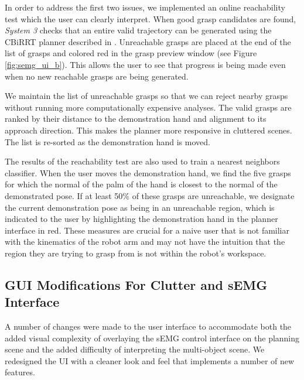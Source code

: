 In order to address the first two issues, we implemented an online reachability test which the user can clearly interpret. When good grasp candidates are found, \emph{System 3} checks that an entire valid trajectory can be generated using the CBiRRT planner described in \cite{berenson-09}. Unreachable grasps are placed at the end of the list of grasps and colored red in the grasp preview window (see Figure \ref{fig:semg_ui_b}). This allows the user to see that progress is being made even when no new reachable grasps are being generated.

We maintain the list of unreachable grasps so that we can reject nearby grasps without running more computationally expensive analyses. The valid grasps are ranked by their distance to the demonstration hand and alignment to its approach direction. This makes the planner more responsive in cluttered scenes. The list is re-sorted as the demonstration hand is moved.

The results of the reachability test are also used to train a nearest neighbors classifier. When the user moves the demonstration hand, we find the five grasps for which the normal of the palm of the hand is closest to the normal of the demonstrated pose. If at least 50\% of these grasps are unreachable, we designate the current demonstration pose as being in an unreachable region, which is indicated to the user by highlighting the demonstration hand in the planner interface in red. These measures are crucial for a naive user that is not familiar with the kinematics of the robot arm and may not have the intuition that the region they are trying to grasp from is not within the robot's workspace.

\subsection{GUI Modifications For Clutter and sEMG Interface}
 A number of changes were made to the user interface to accommodate both the added visual complexity of overlaying the sEMG control interface on the planning scene and the added difficulty of interpreting the multi-object scene. We redesigned the UI with a cleaner look and feel that implements a number of new features. 

